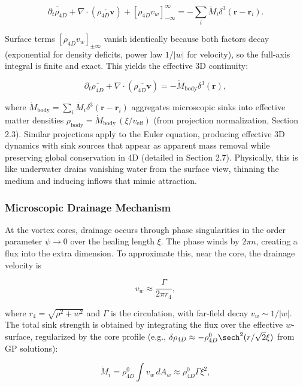 \[
\overline{\partial_t \rho_{4D}} + \nabla \cdot (\overline{\rho_{4D} \mathbf{v}}) + [\rho_{4D} v_w]_{-\infty}^{\infty} = -\sum_i \dot{M}_i \delta^3(\mathbf{r} - \mathbf{r}_i).
\]

Surface terms $[\rho_{4D} v_w]_{\pm \infty}$ vanish identically because both factors decay (exponential for density deficits, power law $1/|w|$ for velocity), so the full-axis integral is finite and exact. This yields the effective 3D continuity:

\[
\partial_t \overline{\rho_{4D}} + \nabla \cdot (\overline{\rho_{4D} \mathbf{v}}) = -\dot{M}_{\text{body}} \delta^3(\mathbf{r}),
\]

where $\dot{M}_{\text{body}} = \sum_i \dot{M}_i \delta^3(\mathbf{r} - \mathbf{r}_i)$ aggregates microscopic sinks into effective matter densities $\rho_{\text{body}} = \dot{M}_{\text{body}} \, (\xi / v_{\text{eff}})$ (from projection normalization, Section 2.3). Similar projections apply to the Euler equation, producing effective 3D dynamics with sink sources that appear as apparent mass removal while preserving global conservation in 4D (detailed in Section 2.7). Physically, this is like underwater drains vanishing water from the surface view, thinning the medium and inducing inflows that mimic attraction.

\subsubsection{Microscopic Drainage Mechanism}
At the vortex cores, drainage occurs through phase singularities in the order parameter $\psi \to 0$ over the healing length $\xi$. The phase winds by $2\pi n$, creating a flux into the extra dimension. To approximate this, near the core, the drainage velocity is

\begin{equation}
v_w \approx \frac{\Gamma}{2\pi r_4},
\end{equation}

where $r_4 = \sqrt{\rho^2 + w^2}$ and $\Gamma$ is the circulation, with far-field decay $v_w \sim 1/|w|$. The total sink strength is obtained by integrating the flux over the effective $w$-surface, regularized by the core profile (e.g., $\delta \rho_{4D} \approx -\rho_{4D}^0 \sech^2(r / \sqrt{2} \xi)$ from GP solutions):

\begin{equation}
\dot{M}_i = \rho_{4D}^0 \int v_w \, dA_w \approx \rho_{4D}^0 \Gamma \xi^2,
\end{equation}

